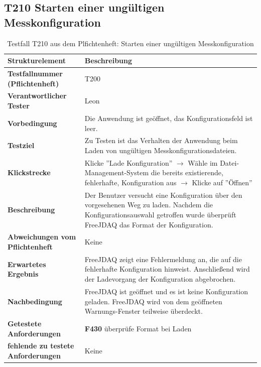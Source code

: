 \documentclass[parskip=full]{scrartcl}
\begin{document}
\subsection{\textbf{T210} Starten einer ungültigen Messkonfiguration}

\begin{table}[h]
    \begin{tabular}{| p{4cm} | p{10cm} |}
        \hline
        \textbf{Strukturelement} & \textbf{Beschreibung} \\ \hline
        \textbf{Testfallnummer (Pflichtenheft)}
        & 
        T200
        \\ \hline
        \textbf{Verantwortlicher Tester}
        & 
        Leon
        \\ \hline
        \textbf{Vorbedingung}
        & 
        Die Anwendung ist geöffnet, das Konfigurationsfeld ist leer.
        \\ \hline
        \textbf{ Testziel}
        & 
        Zu Testen ist das Verhalten der Anwendung beim Laden von ungültigen
        Messkonfigurationsdateien.
        \\ \hline
        
        \textbf{Klickstrecke}
        & 
        Klicke ''Lade Konfiguration'' $\rightarrow$ Wähle im Datei-Management-System die bereits existierende, fehlerhafte, Konfiguration aus $\rightarrow$ Klicke auf ''Öffnen''
        \\ \hline
        
        \textbf{ Beschreibung}
        & 
        Der Benutzer versucht eine Konfiguration über den vorgesehenen Weg zu laden. Nachdem die Konfigurationsauswahl getroffen wurde überprüft FreeJDAQ das Format der Konfiguration.
        \\ \hline
        
        \textbf{Abweichungen vom Pflichtenheft}
        & 
        Keine
        
        \\ \hline
        
        \textbf{Erwartetes Ergebnis}
        & 
        FreeJDAQ zeigt eine Fehlermeldung an, die auf die fehlerhafte Konfiguration hinweist. Anschließend wird der Ladevorgang der Konfiguration abgebrochen.
        \\ \hline
        
        \textbf{Nachbedingung}
        & 
        FreeJDAQ ist geöffnet und es ist keine Konfiguration geladen. FreeJDAQ wird von dem geöffneten Warnungs-Fenster teilweise überdeckt.
        \\ \hline
        
        
        \textbf{Getestete Anforderungen}
        & 
        \textbf{F430} überprüfe Format bei Laden
        \\ \hline
        \textbf{fehlende zu testete Anforderungen}
        & 
        Keine
        \\ \hline
        
        
    \end{tabular}
    \caption{Testfall T210 aus dem Plfichtenheft: Starten einer ungültigen Messkonfiguration}
    \label{testfallT210}
\end{table}
\end{document}
